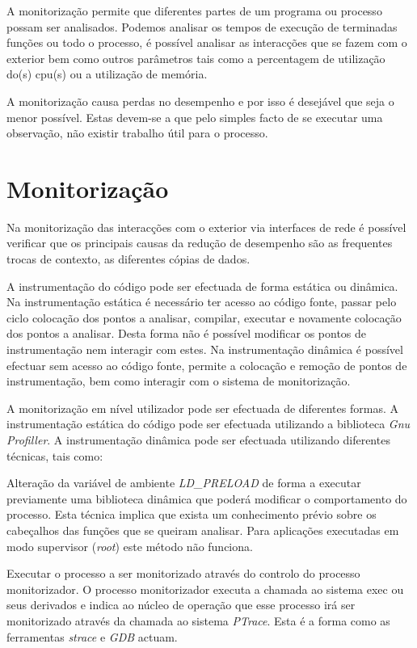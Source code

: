 \documentclass[a4paper]{llncs}
\begin{document}
A monitorização permite que diferentes partes de um programa ou processo possam ser analisados. Podemos analisar os tempos de execução de terminadas funções ou todo o processo, é possível analisar as interacções que se fazem com o exterior bem como outros parâmetros tais como a percentagem de utilização do(s) cpu(s) ou a utilização de memória.

A monitorização causa perdas no desempenho e por isso é desejável que seja o menor possível. Estas devem-se a que pelo simples facto de se executar uma observação, não existir trabalho útil para o processo.

\section{Monitorização}
\label{sec:mon_intro}


Na monitorização das interacções com o exterior via interfaces de rede é possível verificar que os principais causas da redução de desempenho são as frequentes trocas de contexto, as diferentes cópias de dados.


A instrumentação do código pode ser efectuada de forma estática ou dinâmica. Na instrumentação estática é necessário ter acesso ao código fonte, passar pelo ciclo colocação dos pontos a analisar, compilar, executar e novamente colocação dos pontos a analisar. Desta forma não é possível modificar os pontos de instrumentação nem interagir com estes. Na instrumentação dinâmica é possível efectuar sem acesso ao código fonte, permite a colocação e remoção de pontos de instrumentação, bem como interagir com o sistema de monitorização.

A monitorização em nível utilizador pode ser efectuada de diferentes formas. A instrumentação estática do código pode ser efectuada utilizando a biblioteca \textit{Gnu Profiller}. A instrumentação dinâmica pode ser efectuada utilizando diferentes técnicas, tais como:

Alteração da variável de ambiente \textit{LD\_PRELOAD} de forma a executar previamente uma biblioteca dinâmica que poderá modificar o comportamento do processo. Esta técnica implica que exista um conhecimento prévio sobre os cabeçalhos das funções que se queiram analisar. Para aplicações executadas em modo supervisor (\textit{root}) este método não funciona.

Executar o processo a ser monitorizado através do controlo do processo monitorizador. O processo monitorizador executa a chamada ao sistema exec ou seus derivados e indica ao núcleo de operação que esse processo irá ser monitorizado através da chamada ao sistema \textit{PTrace}. Esta é a forma como as ferramentas \textit{strace} e  \textit{GDB} actuam.
\end{document}
